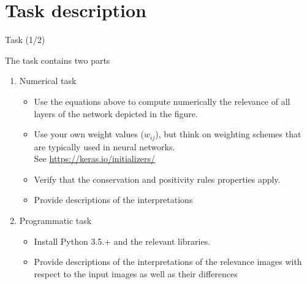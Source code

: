 \documentclass{beamer}
\begin{document}
\section{Task description}

\begin{frame}{Task (1/2)}

The task contains two parts
\begin{enumerate}
\item Numerical task
	\begin{itemize}
		\item Use the equations above to compute numerically the relevance of all layers of the network depicted in the figure.
		\item Use your own weight values ($w_{ij}$), but think on weighting schemes that are typically used in neural networks.\\
		See \url{https://keras.io/initializers/}
		\item Verify that the conservation and positivity rules properties apply.
		\item Provide descriptions of the interpretations
	\end{itemize}
\item Programmatic task
	\begin{itemize}
		\item Install Python 3.5.+ and the relevant libraries.
		\item Provide descriptions of the interpretations of the relevance images with respect to the input images as well as their differences
	\end{itemize}
\end{enumerate}

\end{frame}
\end{document}
